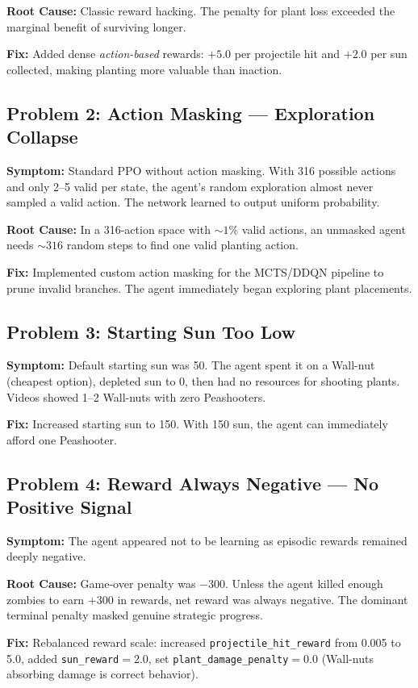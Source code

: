 \textbf{Root Cause:} Classic reward hacking. The penalty for plant loss exceeded the marginal benefit of surviving longer.

\textbf{Fix:} Added dense \emph{action-based} rewards: $+5.0$ per projectile hit and $+2.0$ per sun collected, making planting more valuable than inaction.

\subsection{Problem 2: Action Masking --- Exploration Collapse}
\textbf{Symptom:} Standard PPO without action masking. With 316 possible actions and only 2--5 valid per state, the agent's random exploration almost never sampled a valid action. The network learned to output uniform probability.

\textbf{Root Cause:} In a 316-action space with ${\sim}1\%$ valid actions, an unmasked agent needs ${\sim}316$ random steps to find one valid planting action.

\textbf{Fix:} Implemented custom action masking for the MCTS/DDQN pipeline to prune invalid branches. The agent immediately began exploring plant placements.

\subsection{Problem 3: Starting Sun Too Low}
\textbf{Symptom:} Default starting sun was 50. The agent spent it on a Wall-nut (cheapest option), depleted sun to 0, then had no resources for shooting plants. Videos showed 1--2 Wall-nuts with zero Peashooters.

\textbf{Fix:} Increased starting sun to 150. With 150 sun, the agent can immediately afford one Peashooter.

\subsection{Problem 4: Reward Always Negative --- No Positive Signal}
\textbf{Symptom:} The agent appeared not to be learning as episodic rewards remained deeply negative.

\textbf{Root Cause:} Game-over penalty was $-300$. Unless the agent killed enough zombies to earn $+300$ in rewards, net reward was always negative. The dominant terminal penalty masked genuine strategic progress.

\textbf{Fix:} Rebalanced reward scale: increased \texttt{projectile\_hit\_reward} from 0.005 to 5.0, added \texttt{sun\_reward}$=$2.0, set \texttt{plant\_damage\_penalty}$=$0.0 (Wall-nuts absorbing damage is correct behavior).

